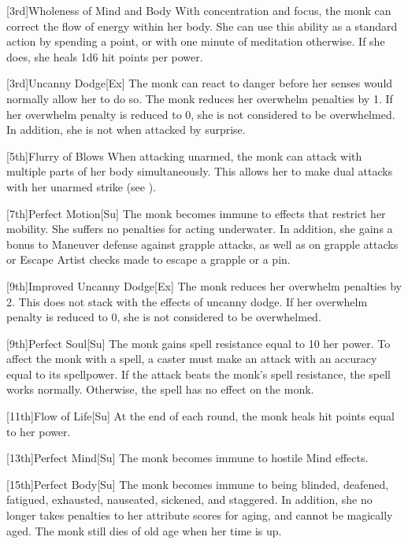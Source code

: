         [3rd]{Wholeness of Mind and Body}
        With concentration and focus, the monk can correct the flow of energy within her body.
        She can use this ability as a standard action by spending a \ki point, or with one minute of meditation otherwise.
        If she does, she heals 1d6 hit points per \ki power.

        [3rd]{Uncanny Dodge}[Ex]
        The monk can react to danger before her senses would normally allow her to do so.
        The monk reduces her overwhelm penalties by 1.
        If her overwhelm penalty is reduced to 0, she is not considered to be overwhelmed.
        In addition, she is not \unaware when attacked by surprise.

        [5th]{Flurry of Blows}
        When attacking unarmed, the monk can attack with multiple parts of her body simultaneously.
        This allows her to make dual attacks with her unarmed strike (see ).

        [7th]{Perfect Motion}[Su]
        The monk becomes immune to effects that restrict her mobility.
        She suffers no penalties for acting underwater.
        In addition, she gains a  bonus to Maneuver defense against grapple attacks, as well as on grapple attacks or Escape Artist checks made to escape a grapple or a pin.

        [9th]{Improved Uncanny Dodge}[Ex]
        The monk reduces her overwhelm penalties by 2.
        This does not stack with the effects of uncanny dodge.
        If her overwhelm penalty is reduced to 0, she is not considered to be overwhelmed.

        [9th]{Perfect Soul}[Su]
        The monk gains spell resistance equal to 10 \add her \ki power.
        To affect the monk with a spell, a caster must make an attack with an accuracy equal to its spellpower.
        If the attack beats the monk's spell resistance, the spell works normally.
        Otherwise, the spell has no effect on the monk.

        [11th]{Flow of Life}[Su]
        At the end of each round, the monk heals hit points equal to her \ki power.

        [13th]{Perfect Mind}[Su]
        The monk becomes immune to hostile Mind effects.

        [15th]{Perfect Body}[Su]
        The monk becomes immune to being blinded, deafened, fatigued, exhausted, nauseated, sickened, and staggered.
        In addition, she no longer takes penalties to her attribute scores for aging, and cannot be magically aged.
        The monk still dies of old age when her time is up.

